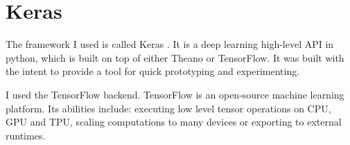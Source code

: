 \section{Keras}
The framework I used is called Keras \cite{keras}. It is a deep learning high-level API in python, which is built on top of either Theano or TensorFlow. It was built with the intent to provide a tool for quick prototyping and experimenting.

I used the TensorFlow \cite{tensorflow} backend.  TensorFlow is an open-source machine learning platform. Its abilities include: executing low level tensor operations on CPU, GPU and TPU, scaling computations to many devices or exporting to external runtimes.


